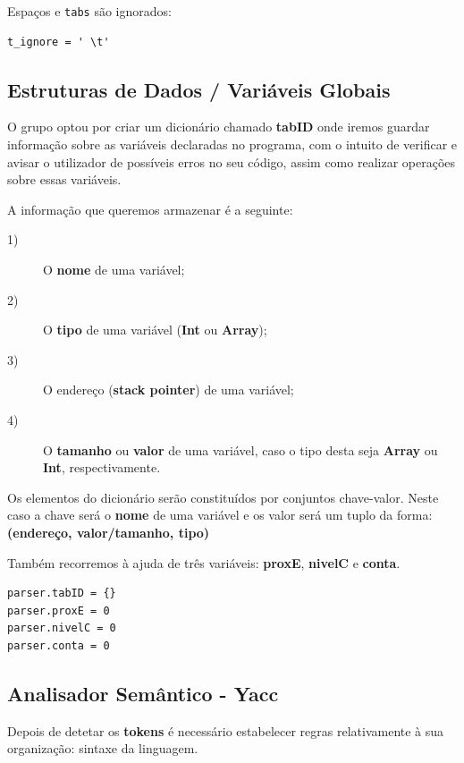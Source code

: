 \documentclass{article}
\begin{document}
Espaços e {\tt tabs} são ignorados:
\begin{lstlisting}[]
t_ignore = ' \t'
\end{lstlisting}

\vspace{1CM}


\subsection{Estruturas de Dados / Variáveis Globais}
\setlength{\parindent}{5ex} O grupo optou por criar um dicionário chamado \textbf{tabID} onde iremos guardar informação sobre as variáveis declaradas no programa, com o intuito de verificar e avisar o utilizador de possíveis erros no seu código, assim como realizar operações sobre essas variáveis.
\par A informação que queremos armazenar é a seguinte:
\begin{description}
\item[1)] O \textbf{nome} de uma variável;

\item[2)] O \textbf{tipo} de uma variável (\textbf{Int} ou \textbf{Array});

\item[3)] O endereço (\textbf{stack pointer}) de uma variável;

\item[4)] O \textbf{tamanho} ou \textbf{valor} de uma variável, caso o tipo desta seja \textbf{Array} ou \textbf{Int}, respectivamente.
\end{description}

Os elementos do dicionário serão constituídos por conjuntos chave-valor. Neste caso a chave será o \textbf{nome} de uma variável e os valor será um tuplo da forma: \textbf{(endereço, valor/tamanho, tipo)}

\par Também recorremos à ajuda de três variáveis: \textbf{proxE}, \textbf{nivelC} e \textbf{conta}.

\begin{lstlisting}[]
parser.tabID = {}   
parser.proxE = 0
parser.nivelC = 0
parser.conta = 0
\end{lstlisting}


\subsection{Analisador Semântico - Yacc}
\setlength{\parindent}{5ex}Depois de detetar os \textbf{tokens} é necessário estabelecer regras relativamente à sua organização: sintaxe da linguagem.
\end{document}
